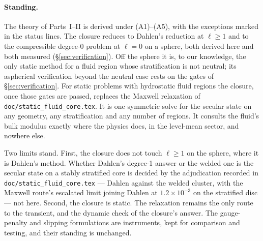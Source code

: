 \documentclass[11pt]{article}
\theoremstyle{definition}
\theoremstyle{remark}
\newcommand{\code}[1]{\texttt{#1}}
\begin{document}
\paragraph{Standing.} The theory of Parts~I--II is derived under
(A1)--(A5), with the exceptions marked in the status lines. The closure
reduces to Dahlen's reduction at $\ell \ge 1$ and to the compressible
degree-0 problem at $\ell = 0$ on a sphere, both derived here and both
measured (\S\ref{sec:verification}). Off the sphere it is, to our
knowledge, the only static method for a fluid region whose
stratification is not neutral; its aspherical verification beyond the
neutral case rests on the gates of \S\ref{sec:verification}. For static
problems with hydrostatic fluid regions the closure, once those gates
are passed, replaces the Maxwell relaxation of
\code{doc/static\_fluid\_core.tex}. It is one symmetric solve for the
secular state on any geometry, any stratification and any number of
regions. It consults the fluid's bulk modulus exactly where the physics
does, in the level-mean sector, and nowhere else.

Two limits stand. First, the closure does not touch $\ell \ge 1$ on the
sphere, where it is Dahlen's method. Whether Dahlen's degree-1 answer
or the welded one is the secular state on a stably stratified core is
decided by the adjudication recorded in
\code{doc/static\_fluid\_core.tex} --- Dahlen against the welded cluster,
with the Maxwell route's escalated limit joining Dahlen at
$1.2\times10^{-3}$ on the stratified disc --- not here. Second, the
closure is static. The relaxation remains the only route to the
transient, and the dynamic check of the closure's answer. The
gauge-penalty and slipping formulations are instruments, kept for
comparison and testing, and their standing is unchanged.
\end{document}
